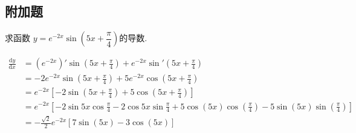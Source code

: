 \documentclass[answers]{exam}
\begin{document}
\begin{questions}
\begin{center}
		\section*{附加题}
	\end{center}
	\question 求函数 $y = e^{-2x}\sin\left(5x+\dfrac{\pi}{4}\right)$的导数.
	\begin{solution}
		\begin{align*}
			\frac{\mathrm{d}y}{\mathrm{d}x} & =  (e^{-2x})'\sin\left(5x + \frac{\pi}{4}\right) + e^{-2x}\sin'\left(5x +
			\frac{\pi}{4}\right)                                                                                        \\
			                                & = -2e^{-2x}\sin\left(5x+\frac{\pi}{4}\right) +
			5e^{-2x}\cos\left(5x+\frac{\pi}{4}\right)                                                                   \\
			                                & = e^{-2x}\left[-2\sin\left(5x + \frac{\pi}{4}\right) + 5\cos\left(5x +
			\frac{\pi}{4}\right)\right]                                                                                 \\
			                                & = e^{-2x}\left[-2\sin5x\cos\frac{\pi}{4} - 2\cos5x\sin\frac{\pi}{4} +
			5\cos(5x)\cos(\frac{\pi}{4}) - 5\sin(5x)\sin(\frac{\pi}{4})\right]                                          \\
			                                & = -\frac{\sqrt{2}}{2}e^{-2x}[7\sin(5x) - 3\cos(5x)]
		\end{align*}
	\end{solution}


\end{questions}
\end{document}
